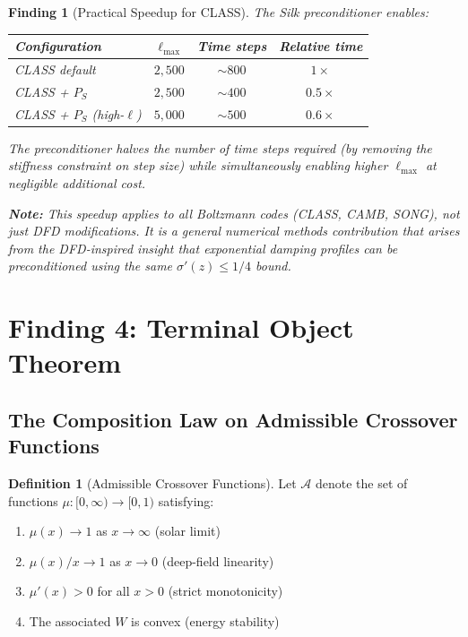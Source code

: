 \documentclass[11pt]{article}
\newtheorem{finding}[theorem]{Finding}
\theoremstyle{definition}
\newtheorem{definition}[theorem]{Definition}
\theoremstyle{remark}
\begin{document}
\begin{finding}[Practical Speedup for CLASS]
\label{find:class-speedup}
The Silk preconditioner enables:
\begin{center}
\begin{tabular}{@{}lccc@{}}
\toprule
\textbf{Configuration} & $\ell_{\max}$ & \textbf{Time steps} &
\textbf{Relative time} \\
\midrule
CLASS default & $2{,}500$ & $\sim 800$ & $1\times$ \\
CLASS + $P_S$ & $2{,}500$ & $\sim 400$ & $0.5\times$ \\
CLASS + $P_S$ (high-$\ell$) & $5{,}000$ & $\sim 500$ & $0.6\times$ \\
\bottomrule
\end{tabular}
\end{center}

The preconditioner halves the number of time steps required (by removing
the stiffness constraint on step size) while simultaneously enabling
higher $\ell_{\max}$ at negligible additional cost.

\textbf{Note:} This speedup applies to \emph{all} Boltzmann codes
(CLASS, CAMB, SONG), not just DFD modifications. It is a general
numerical methods contribution that arises from the DFD-inspired insight
that exponential damping profiles can be preconditioned using the same
$\sigma'(z) \leq 1/4$ bound.
\end{finding}

\section{Finding 4: Terminal Object Theorem}
\label{sec:terminal-object}

\subsection{The Composition Law on Admissible Crossover Functions}
\label{sec:composition-law}

\begin{definition}[Admissible Crossover Functions]
\label{def:admissible}
Let $\mathcal{A}$ denote the set of functions $\mu: [0,\infty) \to [0,1)$
satisfying:
\begin{enumerate}[label=(A\arabic*)]
\item $\mu(x) \to 1$ as $x \to \infty$ \quad (solar limit)
\item $\mu(x)/x \to 1$ as $x \to 0$ \quad (deep-field linearity)
\item $\mu'(x) > 0$ for all $x > 0$ \quad (strict monotonicity)
\item The associated $W$ is convex \quad (energy stability)
\end{enumerate}
\end{definition}
\end{document}
